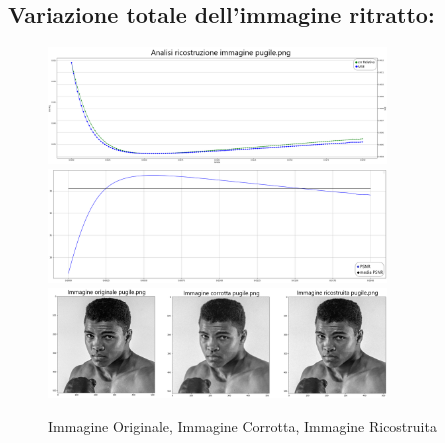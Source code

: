 {\color{rred}\subsection{Variazione totale dell'immagine ritratto:}}
\begin{figure}[H]{}
    \centering
    \includegraphics[width=0.8\textwidth]{IMMAGINI_RELAZIONE/graficoPugileTOTVAR_ERRREL&MSE.png}
    \includegraphics[width=0.8\textwidth]{IMMAGINI_RELAZIONE/graficoPugileTOTVAR_PSNR&suaMedia.png}
    \includegraphics[width=0.8\textwidth]{imgRicostruzione/ricostruzionePugile_TOTVAR_maxPSNR33.70.png}
    \caption{Immagine Originale, Immagine Corrotta, Immagine Ricostruita}
\end{figure}


